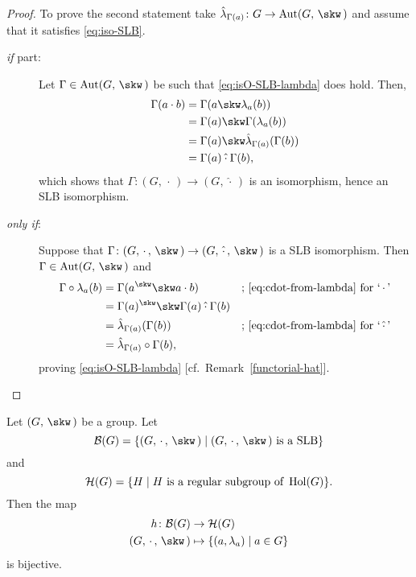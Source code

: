 \begin{proof}
    To prove the second statement take $\hat\lambda_{\Gamma(a)}\colon G\to\Aut(G,\,\skw\,)$ and assume that it satisfies \eqref{eq:iso-SLB}.
    \begin{description}
        \item[\rm{\it if\/} part:] Let $\Gamma\in\Aut(G,\,\skw\,)$ be such that \eqref{eq:isO-SLB-lambda} does hold. Then,
        \begin{align*}
            \Gamma(a\cdot b) &= \Gamma(a\skw\lambda_a(b))\\
                &= \Gamma(a)\skw\Gamma(\lambda_a(b))\\
                &= \Gamma(a)\skw\hat\lambda_{\Gamma(a)}(\Gamma(b))\\
                &= \Gamma(a)\mathbin{\hat\cdot}\Gamma(b),
        \end{align*}
        which shows that $\Gamma\colon(G,\,\cdot\,)\to(G,\,\hat\cdot\,)$ is an isomorphism, hence an SLB isomorphism.

        \item[\rm{\it only if\/}:] Suppose that $\Gamma\colon(G,\,\cdot\,,\,\skw\,)\to(G,\,\hat\cdot\,,\,\skw\,)$ is a SLB isomorphism. Then $\Gamma\in\Aut(G,\,\skw\,)$ and
        \begin{align*}
            \Gamma\circ\lambda_a(b) &= \Gamma(a^\skw\skw a\cdot b)
                    &&\text{; \eqref{eq:cdot-from-lambda} for `$\,\cdot\,$'}\\
                &= \Gamma(a)^\skw\skw\Gamma(a)\mathbin{\hat\cdot}\Gamma(b)\\
                &= \hat\lambda_{\Gamma(a)}(\Gamma(b))
                    &&\text{; \eqref{eq:cdot-from-lambda}
                        for `$\,\mathbin{\hat\cdot}\,$'}\\
                &= \hat\lambda_{\Gamma(a)}\circ\Gamma(b),
        \end{align*}
        proving \eqref{eq:isO-SLB-lambda} [cf.~Remark~\ref{functorial-hat}].
    \end{description}    
\end{proof}

\begin{thm}
    Let $(G,\,\skw\,)$ be a group. Let
    $$
    \mathcal{B}(G) =\set{(G,\,\cdot\,,\,\skw\,)\mid
        (G,\,\cdot\,,\,\skw\,)\text{\rm\ is a SLB}}
    $$
    and
    $$
    \mathcal{H}(G)=\{H\mid H\text {\rm\ is a regular subgroup of } \operatorname{Hol}(G)\}.
    $$    
    Then the map
    \begin{align*}
        h\colon\mathcal{B}(G)&\to\mathcal{H}(G)\\
       (G,\,\cdot\,,\,\skw\,)&\mapsto\set{(a,\lambda_a)\mid a\in G}
    \end{align*}
    is bijective.
\end{thm}

